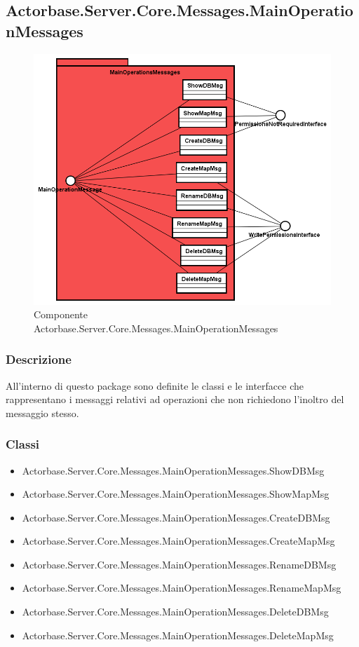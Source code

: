 \documentclass[a4paper]{article}
\begin{document}
			\subsection{Actorbase.Server.Core.Messages.MainOperationMessages}
			\begin{figure} [H]
			\centering
			\includegraphics[scale=0.55]{Server/Package/MainOperationsMessagesLevel.png}
			\caption{Componente Actorbase.Server.Core.Messages.MainOperationMessages}
			\end{figure}
			\subsubsection{Descrizione}
				All'interno di questo package sono definite le classi e le interfacce che rappresentano i messaggi relativi ad operazioni che non richiedono l'inoltro del messaggio stesso.
			\subsubsection{Classi}
			\begin{itemize}
				\item Actorbase.Server.Core.Messages.MainOperationMessages.ShowDBMsg
				\item Actorbase.Server.Core.Messages.MainOperationMessages.ShowMapMsg
				\item Actorbase.Server.Core.Messages.MainOperationMessages.CreateDBMsg
				\item Actorbase.Server.Core.Messages.MainOperationMessages.CreateMapMsg
				\item Actorbase.Server.Core.Messages.MainOperationMessages.RenameDBMsg
				\item Actorbase.Server.Core.Messages.MainOperationMessages.RenameMapMsg
				\item Actorbase.Server.Core.Messages.MainOperationMessages.DeleteDBMsg
				\item Actorbase.Server.Core.Messages.MainOperationMessages.DeleteMapMsg
			\end{itemize}
\end{document}
